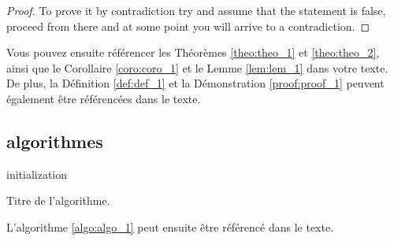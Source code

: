 \begin{proof}
  \label{proof:proof_1}
  To prove it by contradiction try and assume that the statement is false,
  proceed from there and at some point you will arrive to a contradiction.
\end{proof}

Vous pouvez ensuite référencer les Théorèmes \ref{theo:theo_1} et \ref{theo:theo_2}, ainsi que le Corollaire \ref{coro:coro_1} et le Lemme \ref{lem:lem_1} dans votre texte. De plus, la Définition \ref{def:def_1} et la Démonstration \ref{proof:proof_1} peuvent également être référencées dans le texte.

\subsection{algorithmes}

\begin{algorithm}[H]
  initialization\;
  \caption{Titre de l'algorithme.}
  \label{algo:algo_1}
\end{algorithm}

L'algorithme \ref{algo:algo_1} peut ensuite être référencé dans le texte.
